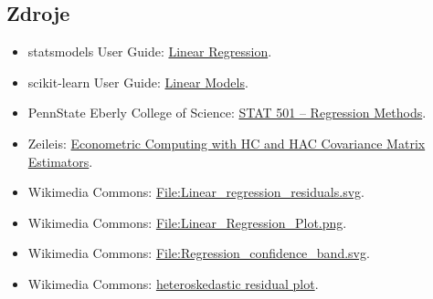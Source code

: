 \subsection{Zdroje}
\begin{itemize}
    \item statsmodels User Guide:
    \href{https://www.statsmodels.org/stable/regression.html}{Linear Regression}.
    \item scikit-learn User Guide:
    \href{https://scikit-learn.org/stable/modules/linear\_model.html}{Linear Models}.
    \item PennState Eberly College of Science:
    \href{https://online.stat.psu.edu/stat501/}{STAT 501 -- Regression Methods}.
    \item Zeileis:
    \href{https://cran.r-project.org/web/packages/sandwich/vignettes/sandwich.pdf}{Econometric Computing with HC and HAC Covariance Matrix Estimators}.
    \item Wikimedia Commons:
    \href{https://commons.wikimedia.org/wiki/File:Linear\_regression\_residuals.svg}{File:Linear\_regression\_residuals.svg}.
    \item Wikimedia Commons:
    \href{https://commons.wikimedia.org/wiki/File:Linear\_Regression\_Plot.png}{File:Linear\_Regression\_Plot.png}.
    \item Wikimedia Commons:
    \href{https://commons.wikimedia.org/wiki/File:Regression\_confidence\_band.svg}{File:Regression\_confidence\_band.svg}.
    \item Wikimedia Commons:
    \href{https://commons.wikimedia.org/wiki/File:Linear\_regression\_residuals\_heteroscedastic.svg}{heteroskedastic residual plot}.
\end{itemize}

\newpage
